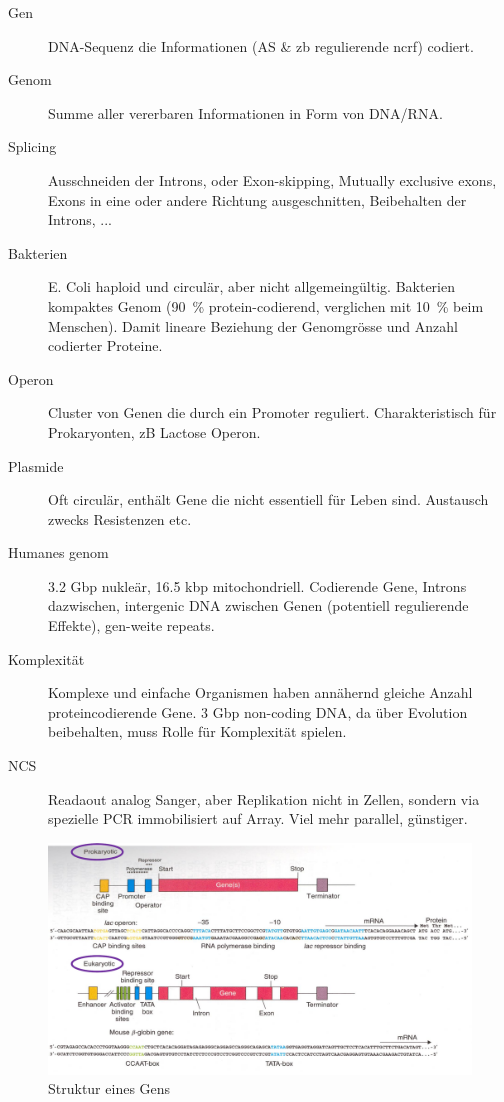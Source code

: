 \documentclass[a4paper,twocolumn,usegeometry,english,fontsize=6,DIV=16]{scrartcl}
\begin{document}
\begin{description}
	\item[Gen] DNA-Sequenz die Informationen (AS \& zb regulierende ncrf)
		codiert.
	\item[Genom] Summe aller vererbaren Informationen in Form von DNA/RNA.
	\item[Splicing] Ausschneiden der Introns, oder Exon-skipping, Mutually
		exclusive exons, Exons in eine oder andere Richtung
		ausgeschnitten, Beibehalten der Introns, ...
	\item[Bakterien] E. Coli haploid und circulär, aber nicht
		allgemeingültig. Bakterien kompaktes Genom (\SI{90}{\percent}
		protein-codierend, verglichen mit \SI{10}{\percent} beim
		Menschen). Damit lineare Beziehung der Genomgrösse und Anzahl
		codierter Proteine.
	\item[Operon] Cluster von Genen die durch ein Promoter reguliert.
		Charakteristisch für Prokaryonten, zB Lactose Operon.
	\item[Plasmide] Oft circulär, enthält Gene die nicht essentiell für
		Leben sind. Austausch zwecks Resistenzen etc.
	\item[Humanes genom] 3.2 Gbp nukleär, 16.5 kbp mitochondriell.
		Codierende Gene, Introns dazwischen, intergenic DNA zwischen
		Genen (potentiell regulierende Effekte), gen-weite repeats.
	\item[Komplexität] Komplexe und einfache Organismen haben annähernd
		gleiche Anzahl proteincodierende Gene. 3 Gbp non-coding DNA, da
		über Evolution beibehalten, muss Rolle für Komplexität spielen.
	\item[NCS] Readaout analog Sanger, aber Replikation nicht in Zellen,
		sondern via spezielle PCR immobilisiert auf Array. Viel mehr
		parallel, günstiger.
\end{description}

\begin{figure}
	\centering
	\includegraphics[width=\linewidth]{img/gen_aufbau.png}
	\caption{Struktur eines Gens}
\end{figure}
\end{document}
